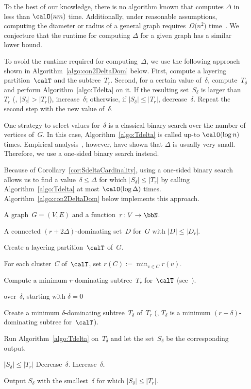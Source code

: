 To the best of our knowledge, there is no algorithm known that computes $\Delta$ in less than $\calO(nm)$ time.
Additionally, under reasonable assumptions, computing the diameter or radius of a general graph requires~$\Omega \big( n^2 \big)$ time~\cite{AbboWillWang2016}.
We conjecture that the runtime for computing $\Delta$ for a given graph has a similar lower bound.

To avoid the runtime required for computing~$\Delta$, we use the following approach shown in Algorithm~\ref{algo:con2DeltaDom} below.
First, compute a layering partition~$\calT$ and the subtree~$T_r$.
Second, for a certain value of~$\delta$, compute~$T_\delta$ and perform Algorithm~\ref{algo:Tdelta} on it.
If the resulting set~$S_\delta$ is larger than~$T_r$ (\ie, $|S_\delta| > |T_r|$), increase~$\delta$; otherwise, if $|S_\delta| \leq |T_r|$, decrease~$\delta$.
Repeat the second step with the new value of~$\delta$.

One strategy to select values for~$\delta$ is a classical binary search over the number of vertices of~$G$.
In this case, Algorithm~\ref{algo:Tdelta} is called up-to $\calO(\log n)$ times.
Empirical analysis~\cite{AbuAtaDragan2016}, however, have shown that $\Delta$ is usually very small.
Therefore, we use a one-sided binary search instead.

Because of Corollary~\ref{cor:SdeltaCardinality}, using a one-sided binary search allows us to find a value~$\delta \leq \Delta$ for which $|S_\delta| \leq |T_r|$ by calling Algorithm~\ref{algo:Tdelta} at most $\calO(\log \Delta)$ times.
Algorithm~\ref{algo:con2DeltaDom} below implements this approach.


\begin{algorithm}
    [htb]
    \caption
    {%
        Computes a connected $(r + 2 \Delta)$-dominating set for a given graph~$G$.
    }
    \label{algo:con2DeltaDom}

\KwIn
{%
    A graph~$G = (V, E)$ and a function~$r \colon V \rightarrow \bbN$.
}

\KwOut
{%
    A connected $(r + 2 \Delta)$-dominating set~$D$ for~$G$ with $|D| \leq |D_r|$.
}

Create a layering partition~$\calT$ of~$G$.

For each cluster~$C$ of~$\calT$, set $r(C) := \min_{v \in C} r(v)$.

Compute a minimum $r$-dominating subtree~$T_r$ for~$\calT$ (see~\cite{Dragan1993}).

\OSBS
{%
    over~\( \delta \), starting with \( \delta = 0 \)
}
{%
    Create a minimum $\delta$-dominating subtree~$T_\delta$ of~$T_r$ (\ie, $T_\delta$ is a minimum $(r + \delta)$-dominating subtree for~$\calT$).

    Run Algorithm~\ref{algo:Tdelta} on~$T_\delta$ and let the set~$S_\delta$ be the corresponding output.

    \If
    {%
        \( |S_\delta| \leq |T_r| \)
    }
    {%
        Decrease~$\delta$.
    }
    \Else
    {%
        Increase~$\delta$.
    }
}

Output $S_\delta$ with the smallest~$\delta$ for which $|S_\delta| \leq |T_r|$.
\end{algorithm}

